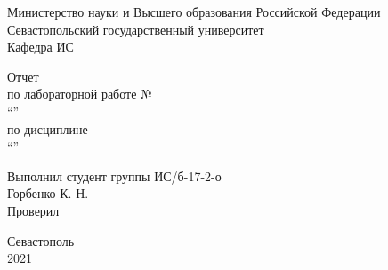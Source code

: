 \begin{titlepage}
    
    \thispagestyle{empty}
    
    \begin{center}
        
        Министерство науки и Высшего образования Российской Федерации \\
        Севастопольский государственный университет \\
        Кафедра ИС
        
        \vfill

        Отчет \\
        по лабораторной работе №\mylabnumber \\
        \enquote{\mylabtitle} \\
        по дисциплине \\
        \enquote{\MakeTextUppercase{\mysubject}}

    \end{center}

    \vspace{1cm}

    \noindent\hspace{7.5cm} Выполнил студент группы ИС/б-17-2-о \\
    \null\hspace{7.5cm} Горбенко К. Н. \\
    \null\hspace{7.5cm} Проверил \\
    \null\hspace{7.5cm} \mylecturer

    \vfill

    \begin{center}
        Севастополь \\
        2021
    \end{center}

\end{titlepage}